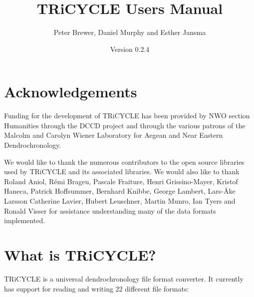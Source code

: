 \documentclass[10pt, headsepline,DIV14,BCOR0.5cm]{scrreprt}
\title{TRiCYCLE Users Manual}
\author{Peter Brewer, Daniel Murphy and Esther Jansma}
\date{Version 0.2.4}
\begin{document}
\maketitle
{}
\setcounter{page}{1}

\tableofcontents


\chapter{Acknowledgements}
\setcounter{page}{1}

Funding for the development of TRiCYCLE has been provided by NWO section Humanities through the
DCCD project and through the various patrons of the Malcolm and Carolyn Wiener Laboratory for Aegean
and Near Eastern Dendrochronology.

We would like to thank the numerous contributors to the open source libraries used by TRiCYCLE and
its associated libraries. We would also like to thank Roland Aniol, Rémi Brageu, Pascale Fraiture,
Henri Grissino-Mayer, Kristof Haneca, Patrick Hoffsummer, Bernhard Knibbe, George Lambert, Lars-Åke Larsson Catherine Lavier, Hubert
Leuschner, Martin Munro, Ian Tyers and Ronald Visser for assistance understanding many of the data
formats implemented.

\chapter{What is TRiCYCLE?}

TRiCYCLE is a universal dendrochronology file format converter. It currently has support for reading and
writing 22 different file formats:
\end{document}
